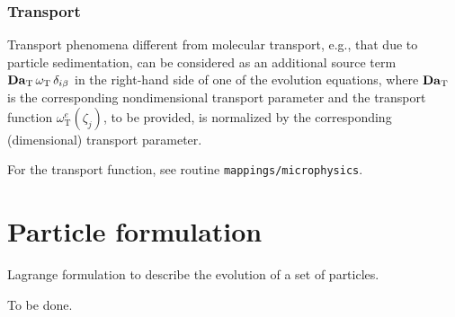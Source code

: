 \subsubsection{Transport}

Transport phenomena different from molecular transport, e.g., that due to particle sedimentation, can be considered as an additional source term $\mathrm{\bf Da}_\mathrm{T}\,\omega_\mathrm{T}\,\delta_{i\beta}$ in the right-hand side of one of the evolution equations, where $\mathrm{\bf Da}_\mathrm{T}$ is the corresponding nondimensional transport parameter and the transport function $\omega_\mathrm{T}^e(\zeta_j)$, to be provided, is normalized by the corresponding (dimensional) transport parameter.

For the transport function, see routine {\tt mappings/microphysics}.

\section{Particle formulation}

Lagrange formulation to describe the evolution of a set of particles.

To be done.
